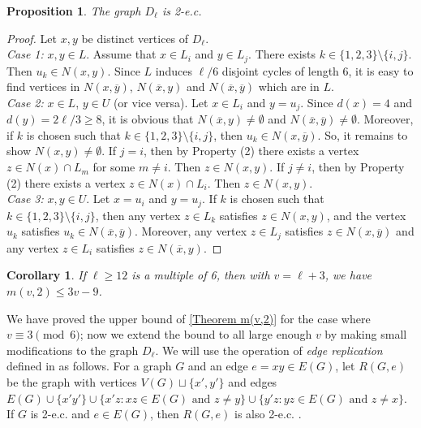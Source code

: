 \documentclass{article}
\newcommand\sm{\setminus}
\newtheorem{prop}[thm]{Proposition}
\newtheorem{cor}[thm]{Corollary}
\theoremstyle{definition}
\begin{document}
\begin{prop}
    The graph $D_\ell$ is 2-e.c.
\end{prop}
\begin{proof}
    Let $x,y$ be distinct vertices of $D_\ell$.\\
    \textit{Case 1:} $x,y\in L$. Assume that $x\in L_i$ and $y\in L_j$. There exists $k\in\{1,2,3\}\sm\{i,j\}$. Then $u_k\in N(x, y)$. Since $L$ induces $\ell/6$ disjoint cycles of length 6, it is easy to find vertices in $N(x,\overline y)$, $N(\overline x,y)$ and $N(\overline x,\overline y)$ which are in $L$.\\
    \textit{Case 2:} $x\in L$, $y\in U$ (or vice versa). Let $x\in L_i$ and $y=u_j$. Since $d(x)=4$ and $d(y)=2\ell/3\ge 8$, it is obvious that $N(\overline x,y)\ne\emptyset$ and $N(\overline x,\overline y)\ne\emptyset$. Moreover, if $k$ is chosen such that $k\in\{1,2,3\}\sm\{i,j\}$, then  $u_k\in N(x,\overline y)$. So, it remains to show $N(x,y)\ne\emptyset$. If $j=i$, then by Property (2) there exists a vertex $z\in N(x)\cap L_{m}$ for some $m\ne i$. Then $z\in N(x,y)$. If $j\ne i$, then by Property (2) there exists a vertex $z\in N(x)\cap L_i$. Then $z\in N(x,y)$.\\
    \textit{Case 3:} $x,y\in U$. Let $x=u_i$ and $y=u_j$. If $k$ is chosen such that $k\in\{1,2,3\}\sm\{i,j\}$, then any vertex $z\in L_k$ satisfies $z\in N(x,y)$, and the vertex $u_k$ satisfies $u_k\in N(\overline x,\overline y)$. Moreover, any vertex $z\in L_j$ satisfies $z\in N(x,\overline y)$ and any vertex $z\in L_i$ satisfies $z\in N(\overline x,y)$. 
\end{proof}

\begin{cor} \label{Corollary 6k+3}
    If $\ell\ge 12$ is a multiple of 6, then with $v=\ell+3$, we have $m(v,2)\le 3v-9$.
\end{cor}

We have proved the upper bound of \autoref{Theorem m(v,2)} for the case where $v\equiv 3\pmod 6$; now we extend the bound to all large enough $v$ by making small modifications to the graph $D_\ell$. We will use the operation of \textit{edge replication} defined in \cite{bonato2001adjacency} as follows. For a graph $G$ and an edge $e=xy\in E(G)$, let $R(G,e)$ be the graph with vertices $V(G)\sqcup\{x',y'\}$ and edges $E(G)\cup\{x'y'\}\cup\{x'z:xz\in E(G)\text{ and }z\ne y\}\cup\{y'z:yz\in E(G)\text{ and }z\ne x\}.$ If $G$ is 2-e.c. and $e\in E(G)$, then $R(G,e)$ is also 2-e.c. \cite{bonato2001adjacency}.
\end{document}
